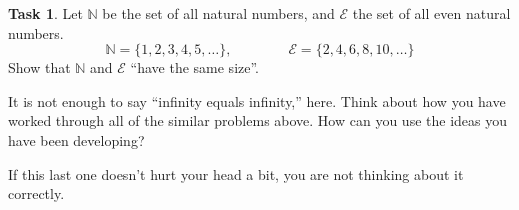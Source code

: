 \documentclass[12pt]{amsart}
\theoremstyle{definition}
\newtheorem{task}{Task}
\begin{document}
\begin{task}
Let $\mathbb{N}$ be the set of all natural numbers, and $\mathcal{E}$ the set of all even natural numbers.
\[
\mathbb{N} = \{ 1, 2, 3, 4, 5, \dots \}, \qquad \qquad \mathcal{E} = \{ 2, 4, 6, 8, 10, \dots \}
\]
Show that $\mathbb{N}$ and $\mathcal{E}$ ``have the same size''.

It is not enough to say ``infinity equals infinity,'' here.
Think about how you have worked through all of the similar problems above.
How can you use the ideas you have been developing?
\end{task}


If this last one doesn't hurt your head a bit, you are not thinking about it correctly.
\end{document}
